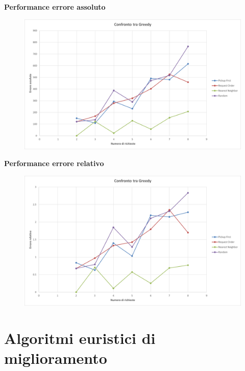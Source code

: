 \documentclass[9pt]{beamer}
\begin{document}
\begin{frame}[allowframebreaks]{\subsecname}
	\textbf{Performance errore assoluto}
      	\begin{figure}[h]
	\centering
	\includegraphics[width=\textwidth]
	{../charts/08c Confronto tra Greedy}
	\end{figure}

\framebreak

	\textbf{Performance errore relativo}
      	\begin{figure}[h]
	\centering
	\includegraphics[width=\textwidth]
	{../charts/08d Confronto tra Greedy}
	\end{figure}

\end{frame}


\section{Algoritmi euristici di miglioramento}
\end{document}
